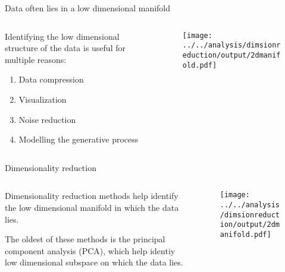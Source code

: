 \documentclass[aspectratio=169]{beamer}
\let\olditem\item
\renewcommand{\item}{\setlength{\itemsep}{\fill}\olditem}
\begin{document}
\begin{frame}[t]{Data often lies in a low dimensional manifold}
  \begin{columns}
    \begin{column}{0.4\textwidth}
      Identifying the low dimensional structure of the data is useful for multiple reasons:
      \begin{enumerate}
        \item Data compression
        \item Visualization
        \item Noise reduction
        \item Modelling the generative process
      \end{enumerate}
      
    \end{column}
    \begin{column}{0.575\textwidth}
      \begin{figure}
        \centering
        \texttt{[image: ../../analysis/dimsionreduction/output/2dmanifold.pdf]}
      \end{figure}
    \end{column}
  \end{columns}
\end{frame}


\begin{frame}[t]{Dimensionality reduction}
  \begin{columns}
    \begin{column}{0.4\textwidth}
      Dimensionality reduction methods help identify the low dimensional manifold in which the data lies.
      \vspace{0.2cm}

      The oldest of these methods is the principal component analysis (PCA), which help identiy low dimensional subspace on which the data lies.
    \end{column}
    \begin{column}{0.575\textwidth}
      \begin{figure}
        \centering
        \texttt{[image: ../../analysis/dimsionreduction/output/2dmanifold.pdf]}
      \end{figure}
    \end{column}
  \end{columns}
\end{frame}
\end{document}
